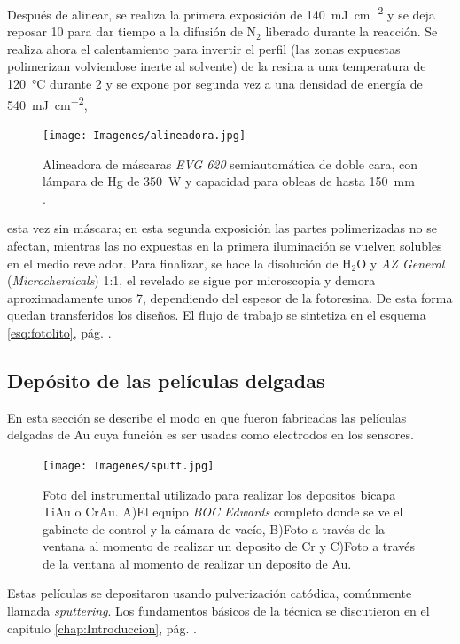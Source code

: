 		Después de alinear, se realiza la primera exposición de \SI{140}{mJ.\cm^{-2}} y se deja reposar \SI{10}{\min} para dar tiempo a la difusión de N$_2$ liberado durante la reacción. Se realiza ahora el calentamiento para invertir el perfil (las zonas expuestas polimerizan volviendose inerte al solvente) de la resina a una temperatura de \SI{120}{\celsius} durante \SI{2}{\min}  y se expone por segunda vez a una densidad de energía de \SI{540}{mJ.cm^{-2}},
		\begin{figure}[ht]
			  \begin{center}
			  \texttt{[image: Imagenes/alineadora.jpg]}
			  \caption[Alineadora de máscaras]{Alineadora de máscaras \textit{EVG 620} semiautomática de doble cara, con lámpara de Hg de \SI{350}{W}  y capacidad para obleas de hasta \SI{150}{\mm} .}
			  \label{fig:alineadora}
			  \end{center}
			  \end{figure}	
		esta vez sin máscara; en esta segunda exposición las partes polimerizadas no se afectan, mientras las no expuestas en la primera iluminación se vuelven solubles en el medio revelador. Para finalizar, se hace la disolución de H$_2$O y \textit{AZ General} (\textit{Microchemicals}) 1:1, el revelado se sigue por microscopia y demora aproximadamente unos \SI{7}{\min}, dependiendo del espesor de la fotoresina. De esta forma quedan transferidos los diseños. El flujo de trabajo se sintetiza en el esquema \ref{esq:fotolito}, pág. \pageref{esq:fotolito}.

	\subsection{Depósito de las películas delgadas}\label{sec:sputt}

			En esta sección se describe el modo en que fueron fabricadas las películas delgadas de Au cuya función es ser usadas como electrodos en los sensores. 
				  \begin{figure}[t!]
				  \begin{center}
				  \texttt{[image: Imagenes/sputt.jpg]}
				  \caption[Equipo para depósito de películas delgadas, \textit{sputtering}]{Foto del instrumental utilizado para realizar los depositos bicapa Ti\textbar Au o Cr\textbar Au. A)El equipo \textit{BOC Edwards} completo donde se ve el gabinete de control y la cámara de vacío, B)Foto a través de la ventana al momento de realizar un deposito de Cr y C)Foto a través de la ventana al momento de realizar un deposito de Au.}
				  \label{fig:sputt}
				  \end{center}
				  \end{figure}	
			Estas películas se depositaron usando pulverización catódica, comúnmente llamada \textit{sputtering}\cite{sigmund1968}. Los fundamentos básicos de la técnica se discutieron en el capitulo \ref{chap:Introduccion}, pág. \pageref{sec:microfabricacion}.

